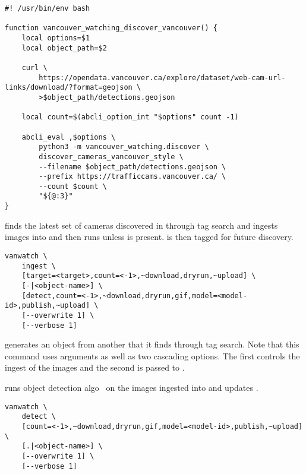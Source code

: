 %
\begin{verbatim}
#! /usr/bin/env bash

function vancouver_watching_discover_vancouver() {
    local options=$1
    local object_path=$2

    curl \
        https://opendata.vancouver.ca/explore/dataset/web-cam-url-links/download/?format=geojson \
        >$object_path/detections.geojson

    local count=$(abcli_option_int "$options" count -1)

    abcli_eval ,$options \
        python3 -m vancouver_watching.discover \
        discover_cameras_vancouver_style \
        --filename $object_path/detections.geojson \
        --prefix https://trafficcams.vancouver.ca/ \
        --count $count \
        "${@:3}"
}
\end{verbatim}

\marginpar{\keyword{ingest}}
\keyword{vanwatch ingest} finds the latest set of cameras discovered in  through tag search and ingests  images into  and then runs  unless  is present.  is then tagged for future discovery. 
%
\begin{verbatim}
vanwatch \
    ingest \
    [target=<target>,count=<-1>,~download,dryrun,~upload] \
    [-|<object-name>] \
    [detect,count=<-1>,~download,dryrun,gif,model=<model-id>,publish,~upload] \
    [--overwrite 1] \
    [--verbose 1]
\end{verbatim}
%
 generates an object from another that it finds through tag search. Note that this command uses arguments as well as two cascading options. The first controls the ingest of the images and the second is passed to .

\marginpar{\keyword{detect}}
 runs object detection algo~\cite{ultralytics} on the images ingested into  and updates .
%
\begin{verbatim}
vanwatch \
    detect \
    [count=<-1>,~download,dryrun,gif,model=<model-id>,publish,~upload] \
    [.|<object-name>] \
    [--overwrite 1] \
    [--verbose 1]
\end{verbatim}